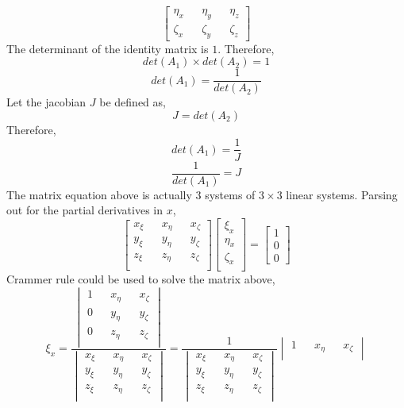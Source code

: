 \documentclass[a4paper, 12pt]{report}
\begin{document}
\begin{center}
$$\begin{bmatrix}
\eta_{x} && \eta_{y} && \eta_{z} \\
\zeta_{x} && \zeta_{y} && \zeta_{z}
\end{bmatrix}$$
The determinant of the identity matrix is $1$. Therefore, 
$$det(A_{1})\times det(A_{2}) = 1$$
$$det(A_{1}) = \frac{1}{det(A_{2})}$$
Let the jacobian $J$ be defined as,
$$J = det(A_{2})$$
Therefore,
$$det(A_{1}) = \frac{1}{J}$$
$$\frac{1}{det(A_{1})} = J$$
The matrix equation above is actually $3$ systems of $3\times3$ linear systems. Parsing out for the partial derivatives in $x$,
$$\begin{bmatrix}
x_{\xi} && x_{\eta} && x_{\zeta} \\
y_{\xi} && y_{\eta} && y_{\zeta} \\
z_{\xi} && z_{\eta} && z_{\zeta} \\
\end{bmatrix}\begin{bmatrix}
\xi_{x} \\
\eta_{x} \\
\zeta_{x} \\
\end{bmatrix} = \begin{bmatrix}
1 \\
0 \\
0 
\end{bmatrix}$$
Crammer rule could be used to solve the matrix above,
$$\xi_{x} = \frac{\displaystyle \begin{vmatrix}
1 && x_{\eta} && x_{\zeta} \\
0 && y_{\eta} && y_{\zeta} \\
0 && z_{\eta} && z_{\zeta} \\
\end{vmatrix}}{\displaystyle \begin{vmatrix}
x_{\xi} && x_{\eta} && x_{\zeta} \\
y_{\xi} && y_{\eta} && y_{\zeta} \\
z_{\xi} && z_{\eta} && z_{\zeta} \\
\end{vmatrix}} = \frac{1}{\displaystyle \begin{vmatrix}
x_{\xi} && x_{\eta} && x_{\zeta} \\
y_{\xi} && y_{\eta} && y_{\zeta} \\
z_{\xi} && z_{\eta} && z_{\zeta} \\
\end{vmatrix}}\begin{vmatrix}
1 && x_{\eta} && x_{\zeta} \\

\end{vmatrix}$$
\end{center}
\end{document}
